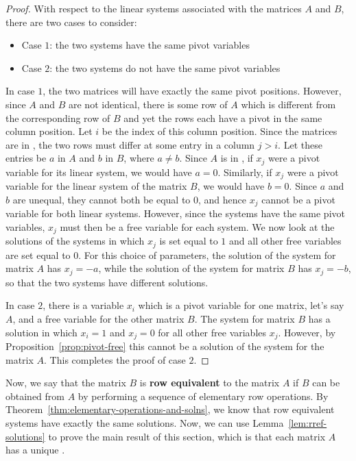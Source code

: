 \begin{proof}
With respect to the linear systems associated with the matrices $A$ and $B$, there are two cases to consider:
\begin{itemize}
\item Case $1$: the two systems have the same pivot variables
\item Case $2$: the two systems do not have the same pivot variables
\end{itemize}
In case $1$, the two matrices will have exactly the same pivot positions. However, since $A$ and $B$ are not identical, there is some row of $A$ which is different from the corresponding row of $B$ and yet the rows each have a pivot in the same column position. Let $i$ be the index of this column position. Since the matrices are in {\rref}, the two rows must differ at some entry in a column $j>i$. Let these entries be $a$ in $A$ and $b$ in $B$, where $a \neq b$. Since $A$ is in {\rref}, if $x_j$ were a pivot variable for its linear system, we would have $a=0$. Similarly, if $x_j$ were a pivot variable for the linear system of the matrix $B$, we would have $b=0$. Since $a$ and $b$ are unequal, they cannot both be equal to $0$, and hence $x_j$ cannot be a pivot variable for both linear systems. However, since the systems have the same pivot variables, $x_j$ must then be a free variable for each system. We now look at the solutions of the systems in which $x_j$ is set equal to $1$ and all other free variables are set equal to $0$. For this choice of parameters, the solution of the system for matrix $A$ has $x_j=-a$, while the solution of the system for matrix $B$ has $x_j=-b$, so that the two systems have different solutions.

In case $2$, there is a variable $x_i$ which is a pivot variable for one matrix, let's say $A$, and a free variable for the other matrix $B$. The system for matrix $B$ has a solution in which $x_i=1$ and $x_j=0$ for all other free variables $x_j$. However, by Proposition~\ref{prop:pivot-free} this cannot be a solution of the system for the matrix $A$. This completes the proof of case $2$.
\end{proof}

Now, we say that the matrix $B$ is \textbf{row equivalent} to the matrix $A$ if $B$ can be obtained from $A$ by performing a sequence of elementary row operations. By Theorem~\ref{thm:elementary-operations-and-solns}, we know that row equivalent systems have exactly the same solutions. Now, we can use Lemma~\ref{lem:rref-solutions} to prove the main result of this section, which is that each matrix $A$ has a unique {\rref}.

